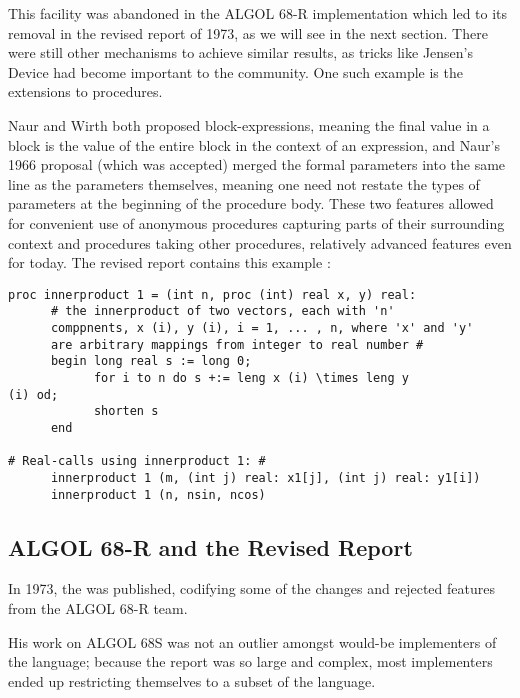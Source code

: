 This facility was abandoned in the ALGOL 68-R implementation which
led to its removal in the revised report of 1973,
as we will see in the next section.
There were still other mechanisms to achieve similar results,
as tricks like Jensen's Device had become important to the community.
One such example is the extensions to procedures.

Naur and Wirth both proposed block-expressions, meaning the final value in a block
is the value of the entire block in the context of an expression, and Naur's
1966 proposal (which was accepted) merged the formal parameters into the same line as
the parameters themselves, meaning one need not restate the types of parameters
at the beginning of the procedure body.
These two features allowed for convenient use of anonymous procedures capturing
parts of their surrounding context and procedures taking other procedures,
relatively advanced features even for today.
The revised report contains this example
\cite[Section 11.2, Innerproduct 1]{revised_report_on_the_algorithmic_language_algol_68_1976}:

\begin{lstlisting}[language=algol,frame=single]
proc innerproduct 1 = (int n, proc (int) real x, y) real:
      # the innerproduct of two vectors, each with 'n'
      comppnents, x (i), y (i), i = 1, ... , n, where 'x' and 'y'
      are arbitrary mappings from integer to real number #
      begin long real s := long 0;
            for i to n do s +:= leng x (i) \times leng y
(i) od;
            shorten s
      end

# Real-calls using innerproduct 1: #
      innerproduct 1 (m, (int j) real: x1[j], (int j) real: y1[i])
      innerproduct 1 (n, nsin, ncos)
\end{lstlisting}

\subsection{ALGOL 68-R and the Revised Report}

In 1973, the  was published,
codifying some of the changes and rejected features from the ALGOL 68-R team.


His work on ALGOL 68S was not an outlier amongst would-be implementers of the
language; because the report was so large and complex, most
implementers ended up restricting themselves to a subset of the language.

